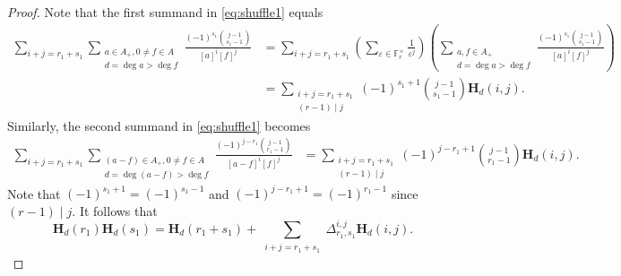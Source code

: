 \documentclass[12pt,reqno]{amsart}
\numberwithin{equation}{section}
\theoremstyle{plain}
\theoremstyle{definition}
\theoremstyle{remark}
\newcommand{\FF}{\mathbb{F}}
\renewcommand{\H}{\mathbf{H}}
\begin{document}
\begin{proof}
    Note that the first summand in \eqref{eq:shuffle1} equals 
    \begin{align*}
        \sum_{i+j=r_1+s_1}\sum_{\substack{a\in A_{+}, 0\neq f\in A\\ d=\deg a>\deg f}}\frac{(-1)^{s_1}\binom{j-1}{s_1-1}}{[a]^i[f]^j}&=\sum_{i+j=r_1+s_1}\left(\sum_{\varepsilon\in\FF_r^\times}\frac{1}{\varepsilon^j}\right)\left(\sum_{\substack{a,f\in A_{+}\\ d=\deg a>\deg f}}\frac{(-1)^{s_1}\binom{j-1}{s_1-1}}{[a]^i[f]^j}\right)
        \\&=\sum_{\substack{i+j=r_1+s_1\\(r-1)\mid j}}(-1)^{s_1+1}\binom{j-1}{s_1-1} \H_{d}(i,j).
    \end{align*}
    Similarly, the second summand in \eqref{eq:shuffle1} becomes
    \begin{align*}
        \sum_{i+j=r_1+s_1}\sum_{\substack{(a-f)\in A_{+}, 0\neq f\in A\\d=\deg (a-f)>\deg f}}\frac{(-1)^{j-r_1}\binom{j-1}{r_1-1}}{[a-f]^i[f]^j}&=\sum_{\substack{i+j=r_1+s_1\\(r-1)\mid j}}(-1)^{j-r_1+1}\binom{j-1}{r_1-1} \H_{d}(i,j).
    \end{align*}
    Note that $(-1)^{s_1+1}=(-1)^{s_1-1}$ and $(-1)^{j-r_1+1}=(-1)^{r_1-1}$ since $(r-1)\mid j$. It follows that 
    $$\H_{d}(r_1)\H_{d}(s_1)=\H_{d}(r_1+s_1)+\sum_{\substack{i+j=r_1+s_1}}\Delta_{r_1,s_1}^{i,j} \H_{d}(i,j).$$
\end{proof}
\end{document}
